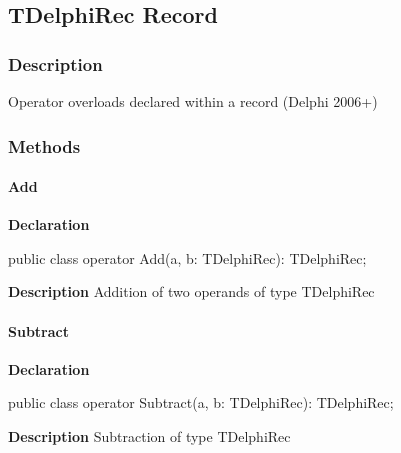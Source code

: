 \documentclass{report}
\begin{document}
\subsection*{TDelphiRec Record}
\subsubsection*{\large{\textbf{Description}}\normalsize\hspace{1ex}\hfill}
Operator overloads declared within a record (Delphi 2006+)\subsubsection*{\large{\textbf{Methods}}\normalsize\hspace{1ex}\hfill}
\paragraph*{Add}\hspace*{\fill}

\begin{list}{}{
\setlength{\itemindent}{0cm}
\setlength{\listparindent}{0cm}
\setlength{\leftmargin}{\evensidemargin}
\addtolength{\leftmargin}{\tmplength}
\settowidth{\labelsep}{X}
\addtolength{\leftmargin}{\labelsep}
\setlength{\labelwidth}{\tmplength}
}
\begin{flushleft}
\item[\textbf{Declaration}\hfill]
\begin{ttfamily}
public class operator Add(a, b: TDelphiRec): TDelphiRec;\end{ttfamily}


\end{flushleft}
\par
\item[\textbf{Description}]
Addition of two operands of type TDelphiRec

\end{list}
\paragraph*{Subtract}\hspace*{\fill}

\begin{list}{}{
\setlength{\itemindent}{0cm}
\setlength{\listparindent}{0cm}
\setlength{\leftmargin}{\evensidemargin}
\addtolength{\leftmargin}{\tmplength}
\settowidth{\labelsep}{X}
\addtolength{\leftmargin}{\labelsep}
\setlength{\labelwidth}{\tmplength}
}
\begin{flushleft}
\item[\textbf{Declaration}\hfill]
\begin{ttfamily}
public class operator Subtract(a, b: TDelphiRec): TDelphiRec;\end{ttfamily}


\end{flushleft}
\par
\item[\textbf{Description}]
Subtraction of type TDelphiRec

\end{list}
\end{document}

